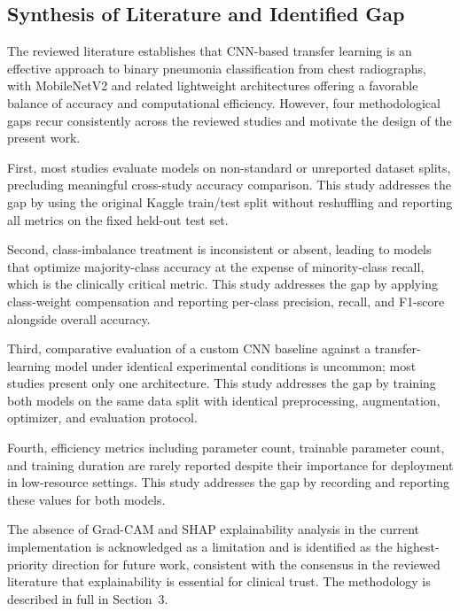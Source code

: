 \documentclass[preprint,12pt]{elsarticle}
\begin{document}
\subsection{Synthesis of Literature and Identified Gap}
The reviewed literature establishes that CNN-based transfer learning
is an effective approach to binary pneumonia classification from chest
radiographs, with MobileNetV2 and related lightweight architectures
offering a favorable balance of accuracy and computational efficiency.
However, four methodological gaps recur consistently across the
reviewed studies and motivate the design of the present work.

First, most studies evaluate models on non-standard or unreported
dataset splits, precluding meaningful cross-study accuracy comparison.
This study addresses the gap by using the original Kaggle train/test
split without reshuffling and reporting all metrics on the fixed
held-out test set.

Second, class-imbalance treatment is inconsistent or absent, leading
to models that optimize majority-class accuracy at the expense of
minority-class recall, which is the clinically critical metric.
This study addresses the gap by applying class-weight compensation
and reporting per-class precision, recall, and F1-score alongside
overall accuracy.

Third, comparative evaluation of a custom CNN baseline against a
transfer-learning model under identical experimental conditions is
uncommon; most studies present only one architecture.
This study addresses the gap by training both models on the same data
split with identical preprocessing, augmentation, optimizer, and
evaluation protocol.

Fourth, efficiency metrics including parameter count, trainable
parameter count, and training duration are rarely reported despite
their importance for deployment in low-resource settings.
This study addresses the gap by recording and reporting these values
for both models.

The absence of Grad-CAM and SHAP explainability analysis in the
current implementation is acknowledged as a limitation and is
identified as the highest-priority direction for future work,
consistent with the consensus in the reviewed literature that
explainability is essential for clinical trust.
The methodology is described in full in Section~3.
\end{document}
